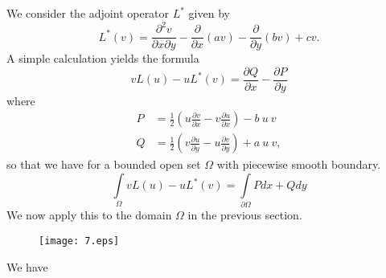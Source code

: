 We consider the adjoint operator $L^{\ast}$ given by
$$
L^{\ast}(v)=\frac{\partial^{2}v}{\partial x\partial y}-\frac{\partial}{\partial x}(av)-\frac{\partial}{\partial y}(bv)+cv.
$$
A simple calculation yields the formula
$$
vL(u)-uL^{\ast}(v)=\frac{\partial Q}{\partial x}-\frac{\partial P}{\partial y}
$$
where
\begin{align*}
P &= \frac{1}{2}\left(u\frac{\partial v}{\partial x}-v\frac{\partial u}{\partial x}\right)-b \ u \ v\\[3pt]
Q &= \frac{1}{2}\left(v\frac{\partial u}{\partial y}-u\frac{\partial v}{\partial y}\right)+a \ u \ v,
\end{align*}
so that we have for a bounded open set $\Omega$ with piecewise smooth boundary.
$$
\int\limits_{\Omega}vL(u)-uL^{\ast}(v)=\int\limits_{\partial \Omega}Pdx+Qdy
$$
We now apply this to the domain $\Omega$ in the previous section.
\begin{figure}[H]
\centering
\texttt{[image: 7.eps]}
\end{figure}

We have


